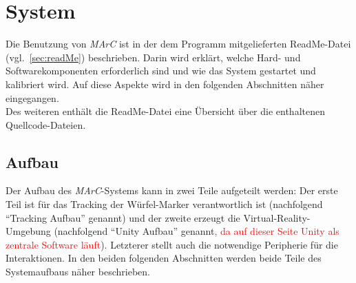 
\section{System}\label{sec:system}
Die Benutzung von \textit{MArC} ist in der dem Programm mitgelieferten ReadMe-Datei (vgl.~\ref{sec:readMe}) beschrieben. Darin wird erklärt, welche Hard- und Softwarekomponenten erforderlich sind und wie das System gestartet und kalibriert wird. Auf diese Aspekte wird in den folgenden Abschnitten näher eingegangen.\\ 
Des weiteren enthält die ReadMe-Datei eine Übersicht über die enthaltenen Quellcode-Dateien.
\subsection{Aufbau}\label{sec:Aufbau}

Der Aufbau des \textit{MArC}-Systems kann in zwei Teile aufgeteilt werden: Der erste Teil ist für das Tracking der Würfel-Marker verantwortlich ist (nachfolgend "`Tracking Aufbau"' genannt) und der zweite erzeugt die Virtual-Reality-Umgebung (nachfolgend "`Unity Aufbau"' genannt\textcolor{red}{, da auf dieser Seite Unity als zentrale Software läuft}). Letzterer stellt auch die notwendige Peripherie für die Interaktionen. In den beiden folgenden Abschnitten werden beide Teile des Systemaufbaus näher beschrieben.

